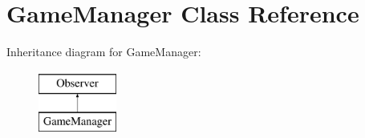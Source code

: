 \hypertarget{class_game_manager}{\section{Game\-Manager Class Reference}
\label{class_game_manager}
}
Inheritance diagram for Game\-Manager\-:\begin{figure}[H]
\begin{center}
\leavevmode
\includegraphics[height=2.000000cm]{class_game_manager}
\end{center}
\end{figure}

